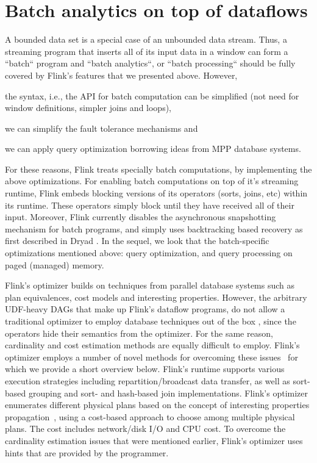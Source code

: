 
\section{Batch analytics on top of dataflows}
\label{sec:batch}
A bounded data set is a special case of an unbounded data stream. Thus, a streaming program that inserts all of its input data in a window can form a ``batch`` program and ``batch analytics``, or ``batch processing`` should be fully covered by Flink's features that we presented above. However, \begin{inparaenum}[i)]
  \item the syntax, i.e., the API for batch computation can be simplified (not need for window definitions, simpler joins and loops),
  \item we can simplify the fault tolerance mechanisms and
  \item we can apply query optimization borrowing ideas from MPP database systems.
\end{inparaenum}
For these reasons, Flink treats specially batch computations, by implementing the above optimizations. For enabling batch computations on top of it's streaming runtime, Flink embeds blocking versions of its operators (sorts, joins, etc) within its runtime. These operators simply block until they have received all of their input. Moreover, Flink currently disables the asynchronous snapshotting mechanism for batch programs, and simply uses backtracking based recovery as first described in Dryad \cite{isard2007dryad}. In the sequel, we look that the batch-specific optimizations mentioned above: query optimization, and query processing on paged (managed) memory.

 Flink's optimizer builds on techniques from parallel database systems such as plan equivalences, cost models and interesting properties. However, the arbitrary UDF-heavy DAGs that make up Flink's dataflow programs, do not allow a traditional optimizer to employ database techniques out of the box \cite{blackBoxes}, since the operators hide their semantics from the optimizer. For the same reason, cardinality and cost estimation methods are equally difficult to employ. Flink's optimizer employs a number of novel methods for overcoming these issues~\cite{blackBoxes, stratosphere, DBLP:journals/pvldb/EwenTKM12} for which we provide a short overview below. Flink's runtime supports various execution strategies including repartition/broadcast data transfer, as well as sort-based grouping and sort- and hash-based join implementations. Flink's optimizer enumerates different physical plans based on the concept of interesting properties propagation~\cite{scopeOptimizer}, using a cost-based approach to choose among multiple physical plans. The cost includes network/disk I/O and CPU cost. To overcome the cardinality estimation issues that were mentioned earlier, Flink's optimizer uses hints that are provided by the programmer.

